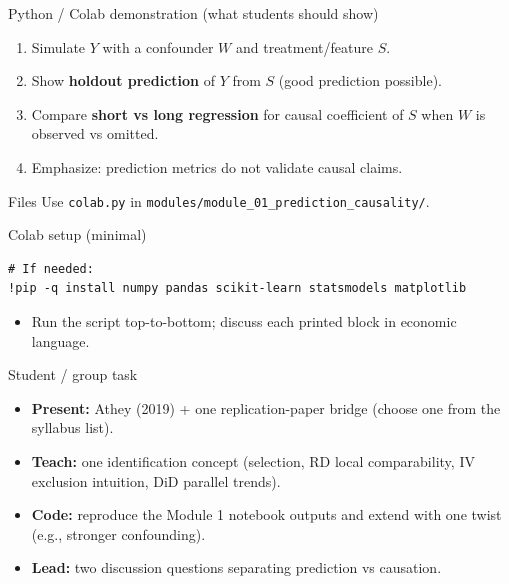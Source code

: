 \documentclass[aspectratio=169,11pt]{beamer}
\begin{document}
\begin{frame}{Python / Colab demonstration (what students should show)}
  \begin{enumerate}
    \item Simulate \(Y\) with a confounder \(W\) and treatment/feature \(S\).
    \item Show \textbf{holdout prediction} of \(Y\) from \(S\) (good prediction possible).
    \item Compare \textbf{short vs long regression} for causal coefficient of \(S\) when \(W\) is observed vs omitted.
    \item Emphasize: prediction metrics do not validate causal claims.
  \end{enumerate}
  \vspace{0.3em}
  \begin{block}{Files}
    Use \texttt{colab.py} in \texttt{modules/module\_01\_prediction\_causality/}.
  \end{block}
\end{frame}

\begin{frame}[fragile]{Colab setup (minimal)}
  \begin{verbatim}
# If needed:
!pip -q install numpy pandas scikit-learn statsmodels matplotlib
  \end{verbatim}
  \vspace{0.2em}
  \begin{itemize}
    \item Run the script top-to-bottom; discuss each printed block in economic language.
  \end{itemize}
\end{frame}

\begin{frame}{Student / group task}
  \begin{itemize}
    \item \textbf{Present:} Athey (2019) + one replication-paper bridge (choose one from the syllabus list).
    \item \textbf{Teach:} one identification concept (selection, RD local comparability, IV exclusion intuition, DiD parallel trends).
    \item \textbf{Code:} reproduce the Module 1 notebook outputs and extend with one twist (e.g., stronger confounding).
    \item \textbf{Lead:} two discussion questions separating prediction vs causation.
  \end{itemize}
\end{frame}
\end{document}
